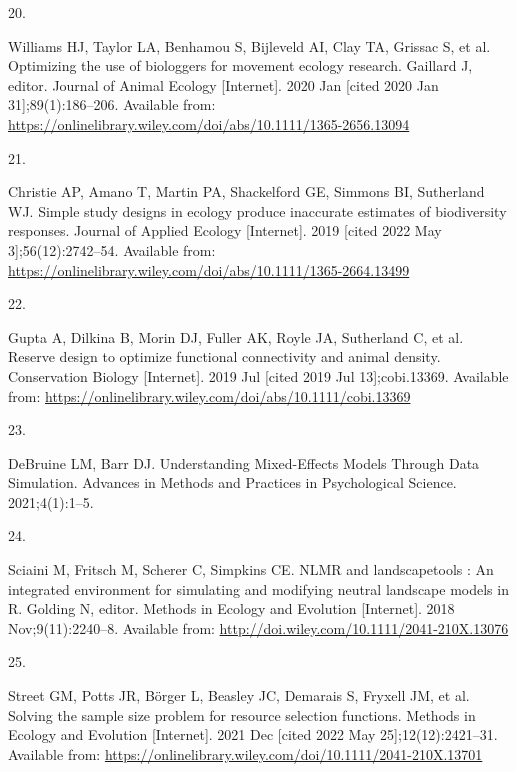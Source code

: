 \documentclass[10pt,a4paper]{article}
\newlength{\cslhangindent}
\newlength{\csllabelwidth}
\newlength{\cslentryspacingunit} %
\newenvironment{CSLReferences}[2] %
 {%
  \setlength{\parindent}{0pt}
  \ifodd #1
  \let\oldpar\par
  \def\par{\hangindent=\cslhangindent\oldpar}
  \fi
  \setlength{\parskip}{#2\cslentryspacingunit}
 }%
 {}
\newcommand{\CSLLeftMargin}[1]{\parbox[t]{\csllabelwidth}{#1}}
\newcommand{\CSLRightInline}[1]{\parbox[t]{\linewidth - \csllabelwidth}{#1}\break}
\begin{document}
\begin{CSLReferences}{0}{0}
\leavevmode{}%
\CSLLeftMargin{20. }
\CSLRightInline{Williams HJ, Taylor LA, Benhamou S, Bijleveld AI, Clay TA, Grissac S, et al. Optimizing the use of biologgers for movement ecology research. Gaillard J, editor. Journal of Animal Ecology {[}Internet{]}. 2020 Jan {[}cited 2020 Jan 31{]};89(1):186--206. Available from: \url{https://onlinelibrary.wiley.com/doi/abs/10.1111/1365-2656.13094}}

\leavevmode{}%
\CSLLeftMargin{21. }
\CSLRightInline{Christie AP, Amano T, Martin PA, Shackelford GE, Simmons BI, Sutherland WJ. Simple study designs in ecology produce inaccurate estimates of biodiversity responses. Journal of Applied Ecology {[}Internet{]}. 2019 {[}cited 2022 May 3{]};56(12):2742--54. Available from: \url{https://onlinelibrary.wiley.com/doi/abs/10.1111/1365-2664.13499}}

\leavevmode{}%
\CSLLeftMargin{22. }
\CSLRightInline{Gupta A, Dilkina B, Morin DJ, Fuller AK, Royle JA, Sutherland C, et al. Reserve design to optimize functional connectivity and animal density. Conservation Biology {[}Internet{]}. 2019 Jul {[}cited 2019 Jul 13{]};cobi.13369. Available from: \url{https://onlinelibrary.wiley.com/doi/abs/10.1111/cobi.13369}}

\leavevmode{}%
\CSLLeftMargin{23. }
\CSLRightInline{DeBruine LM, Barr DJ. Understanding {Mixed}-{Effects} {Models} {Through} {Data} {Simulation}. Advances in Methods and Practices in Psychological Science. 2021;4(1):1--5. }

\leavevmode{}%
\CSLLeftMargin{24. }
\CSLRightInline{Sciaini M, Fritsch M, Scherer C, Simpkins CE. {NLMR} and landscapetools : {An} integrated environment for simulating and modifying neutral landscape models in {R}. Golding N, editor. Methods in Ecology and Evolution {[}Internet{]}. 2018 Nov;9(11):2240--8. Available from: \url{http://doi.wiley.com/10.1111/2041-210X.13076}}

\leavevmode{}%
\CSLLeftMargin{25. }
\CSLRightInline{Street GM, Potts JR, Börger L, Beasley JC, Demarais S, Fryxell JM, et al. Solving the sample size problem for resource selection functions. Methods in Ecology and Evolution {[}Internet{]}. 2021 Dec {[}cited 2022 May 25{]};12(12):2421--31. Available from: \url{https://onlinelibrary.wiley.com/doi/10.1111/2041-210X.13701}}


\end{CSLReferences}
\end{document}
